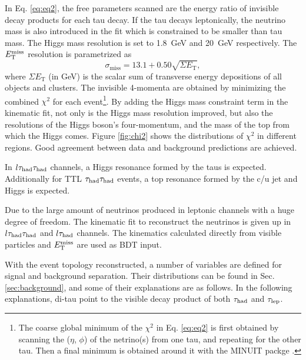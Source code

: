In Eq. \ref{eq:eq2}, the free parameters scanned are the energy ratio of invisible decay products for each tau decay. If the tau decays leptonically, the neutrino mass is also introduced in the fit which is constrained to be smaller than tau mass.
The Higgs mass resolution is set to 1.8~GeV and 20~GeV respectively. The $E_{\text{T}}^{\text{miss}}$ resolution is parametrized as
\begin{equation}
\sigma_{\text{miss}}=13.1 + 0.50\sqrt{\Sigma E_\text{T}},
\label{eq:eq7}
\end{equation}
where $\Sigma E_\text{T}$ (in GeV) is the scalar sum of transverse energy depositions of all objects and clusters. The invisible 4-momenta are obtained by minimizing the combined $\chi^2$ for each event\footnote{
The coarse global minimum of the $\chi^2$ in Eq. \ref{eq:eq2} is first obtained by scanning the ($\eta$, $\phi$) of the netrino(s) from one tau, and repeating for the other tau. Then a final minimum is obtained around it with the MINUIT packge \cite{MINUIT}.
}. By adding the Higgs mass constraint term in the kinematic fit, not only is the Higgs mass resolution improved, but also the resolutions of the Higgs boson's four-momentum, and the mass of the top from which the Higgs comes. Figure \ref{fig:chi2} shows the distributions of $\chi^2$ in different regions. Good agreement between data and background predictions are achieved.



In $l\tau_\text{had}{}\tau_\text{had}$ channels, a Higgs resonance formed by the taus is expected. Additionally for TTL $\tau_\text{had}{}\tau_\text{had}$ events, a top resonance formed by the c/u jet and Higgs is expected.

Due to the large amount of neutrinos produced in leptonic channels with a huge degree of freedom. The kinematic fit to reconstruct the neutrinos is given up in $l\tau_\text{had}{}\tau_\text{had}$ and $l\tau_\text{had}$ channels. The kinematics calculated directly from visible particles and $E_{\text{T}}^{\text{miss}}$ are used as BDT input.

With the event topology reconstructed, a number of variables are defined for signal and background separation. Their distributions can be found in Sec. \ref{sec:background}, and some of their explanations are as follows. In the following explanations, di-tau point to the visible decay product of both $\tau_\text{had}$ and $\tau_\text{lep}$.

